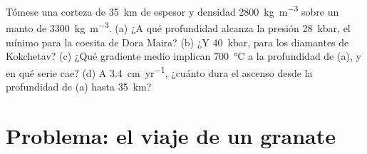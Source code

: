 \begin{exercise}[$\star\star\star$]\label{exo:b2:pt-paths:12}
Tómese una corteza de \qty{35}{km} de espesor y densidad \qty{2800}{kg.m^{-3}} sobre un manto de
\qty{3300}{kg.m^{-3}}. (a) ¿A qué profundidad alcanza la presión \qty{28}{kbar}, el
mínimo para la coesita de Dora Maira? (b) ¿Y \qty{40}{kbar}, para los diamantes de Kokchetav?
(c) ¿Qué gradiente medio implican \qty{700}{\celsius} a la profundidad de (a), y en qué
serie cae? (d) A \qty{3.4}{cm.yr^{-1}}, ¿cuánto dura el ascenso desde la profundidad
de (a) hasta \qty{35}{km}?
\end{exercise}

\section{Problema: el viaje de un granate}

